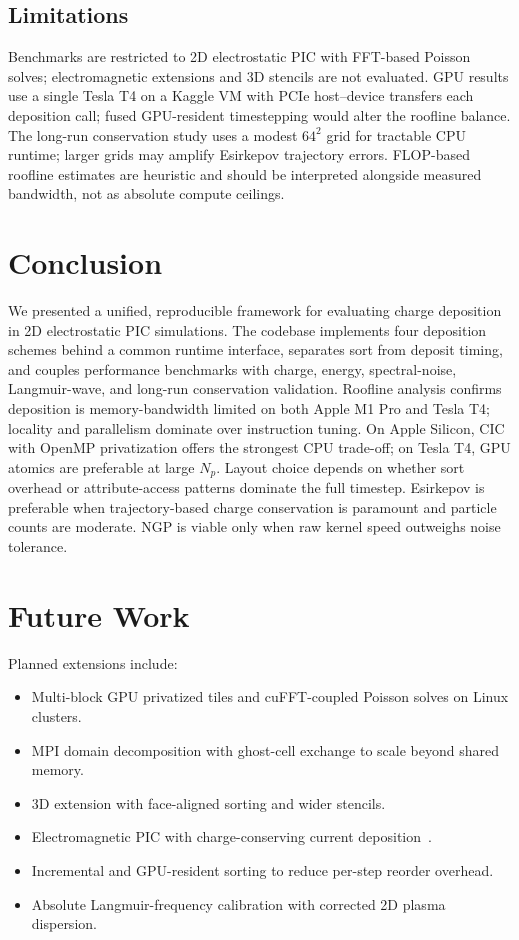 \subsection{Limitations}
Benchmarks are restricted to 2D electrostatic PIC with FFT-based Poisson solves; electromagnetic extensions and 3D stencils are not evaluated.
GPU results use a single Tesla T4 on a Kaggle VM with PCIe host--device transfers each deposition call; fused GPU-resident timestepping would alter the roofline balance.
The long-run conservation study uses a modest $64^2$ grid for tractable CPU runtime; larger grids may amplify Esirkepov trajectory errors.
FLOP-based roofline estimates are heuristic and should be interpreted alongside measured bandwidth, not as absolute compute ceilings.

\section{Conclusion}
We presented a unified, reproducible framework for evaluating charge deposition in 2D electrostatic PIC simulations.
The codebase implements four deposition schemes behind a common runtime interface, separates sort from deposit timing, and couples performance benchmarks with charge, energy, spectral-noise, Langmuir-wave, and long-run conservation validation.
Roofline analysis confirms deposition is memory-bandwidth limited on both Apple M1 Pro and Tesla T4; locality and parallelism dominate over instruction tuning.
On Apple Silicon, CIC with OpenMP privatization offers the strongest CPU trade-off; on Tesla T4, GPU atomics are preferable at large $N_p$.
Layout choice depends on whether sort overhead or attribute-access patterns dominate the full timestep.
Esirkepov is preferable when trajectory-based charge conservation is paramount and particle counts are moderate.
NGP is viable only when raw kernel speed outweighs noise tolerance.

\section{Future Work}
Planned extensions include:
\begin{itemize}
    \item Multi-block GPU privatized tiles and cuFFT-coupled Poisson solves on Linux clusters.
    \item MPI domain decomposition with ghost-cell exchange to scale beyond shared memory.
    \item 3D extension with face-aligned sorting and wider stencils.
    \item Electromagnetic PIC with charge-conserving current deposition~\cite{decyk1996,wilke2017}.
    \item Incremental and GPU-resident sorting to reduce per-step reorder overhead.
    \item Absolute Langmuir-frequency calibration with corrected 2D plasma dispersion.
\end{itemize}

